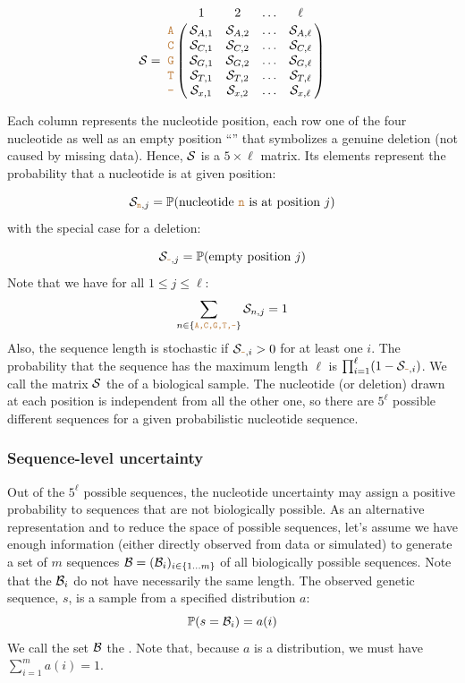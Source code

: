 \documentclass[10pt]{article}
\begin{document}
\begin{equation}
\nps = \bordermatrix{   & 1 & 2 & \ldots & \ell \cr
                \sq{A} & \nps_{A, 1} & \nps_{A, 2} & \ldots & \nps_{A, \ell} \cr
                \sq{C} & \nps_{C, 1} & \nps_{C, 2} & \ldots & \nps_{C, \ell} \cr
                \sq{G} & \nps_{G, 1} & \nps_{G, 2} & \ldots & \nps_{G, \ell} \cr
                \sq{T} & \nps_{T, 1} & \nps_{T, 2} & \ldots & \nps_{T, \ell} \cr 
                \sq{-} & \nps_{x, 1} & \nps_{x, 2} & \ldots & \nps_{x, \ell} \cr 
}\label{eq:nps}
\end{equation}

Each column represents the nucleotide position, each row one of the four nucleotide  as well as an empty position ``\sq{-}'' that symbolizes a genuine deletion (not caused by missing data).
Hence, $\mathcal{S}$ is a $5\times\ell$ matrix. Its elements represent the probability that a nucleotide is at given position:

\begin{equation}
\mathcal{S}_{\texttt{\textcolor{brown}{n}},j} = \mathbb{P}(\text{nucleotide \texttt{\textcolor{brown}{n}} is at position }j)
\end{equation}
with the special case for a deletion:

\begin{equation}
\mathcal{S}_{\texttt{\textcolor{brown}{-}},j} = \mathbb{P}(\text{empty position }j)
\end{equation}
Note that we have for all $1\leq j \leq \ell$:
\begin{equation}
\sum_{n\in \{ \texttt{\textcolor{brown}{A,C,G,T,-}} \} } \mathcal{S}_{n, j} = 1
\end{equation}
Also, the sequence length is stochastic if $\mathcal{S}_{\texttt{\textcolor{brown}{-}},i}>0$ for at least one $i$. The probability that the sequence has the maximum length $\ell$ is $\prod_{i=1}^\ell (1-\mathcal{S}_{\texttt{\textcolor{brown}{-}},i})$. 
We call the matrix $\mathcal{S}$ the \emph{\nlps} of a biological sample.
The nucleotide (or deletion) drawn at each position is independent from all the other one, so there are $5^\ell$ possible different sequences for a given probabilistic nucleotide sequence. 



\subsubsection{Sequence-level uncertainty}

Out of the $5^\ell$ possible sequences, the nucleotide uncertainty may assign a positive probability to sequences that are not biologically possible.
As an alternative representation and to reduce the space of possible sequences, let's assume we have enough information (either directly observed from data or simulated) to generate a set of $m$ sequences $\mathcal{B} = (\mathcal{B}_i)_{i\in\{1\ldots m\} }$ of all biologically possible sequences. Note that the $\mathcal{B}_i$ do not have necessarily the same length. 
The observed genetic sequence, $s$, is a sample from a specified distribution $a$:
\begin{equation}
\mathbb{P}(s = \mathcal{B}_i) = a(i)
\end{equation}
We call the set $\mathcal{B}$ the \emph{\slps}. Note that, because $a$ is a distribution, we must have $\sum_{i=1}^m a(i) = 1$. 
\end{document}
